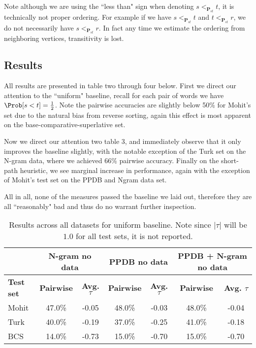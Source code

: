 \begin{remark}
	Note although we are using the ``less than" sign when denoting $s <_{\pmb{P}_{st}} t$, it is technically not proper ordering. For example if we have $s <_{\pmb{P}_{st}} t$ and $t <_{\pmb{P}_{st}} r$, we do not necessarily have $s <_{\pmb{P}_{st}} r$. In fact any time we estimate the ordering from neighboring vertices, transitivity is lost.
\end{remark}



\subsection{Results}

All results are presented in table two through four below. First we direct our attention to the ``uniform" baseline, recall for each pair of words we have $\Prob[s < t] = \frac{1}{2}$. Note the pairwise accuracies are slightly below 50\% for Mohit's set due to the natural bias from reverse sorting, again this effect is most apparent on the base-comparative-superlative set.

Now we direct our attention two table 3, and immediately observe that it only improves the baseline slightly, with the notable exception of the Turk set on the N-gram data, where we achieved $66\%$ pairwise accuracy. Finally on the short-path heuristic, we see marginal increase in performance, again with the exception of Mohit's test set on the PPDB and Ngram data set. 

All in all, none of the measures passed the baseline we laid out, therefore they are all ``reasonably" bad and thus do no warrant further inspection.


\begin{table}
\small
\centering
\begin{tabular}{|l|cc|cc|cc|}
	\hline 
	& \multicolumn{2}{c|}{N-gram no data} 
	& \multicolumn{2}{c|}{PPDB no data} 
	& \multicolumn{2}{c|}{PPDB + N-gram no data} \\
	\hline 
	\bf Test set
	& \bf Pairwise & \bf Avg. $\tau$  
	& \bf Pairwise & \bf Avg. $\tau$  
	& \bf Pairwise & \bf Avg. $\tau$  \\ 
	\hline
	Mohit & 47.0\% & -0.05  & 48.0\% & -0.03 & 48.0\% & -0.04 \\
	Turk  & 40.0\% & -0.19  & 37.0\% & -0.25 & 41.0\% & -0.18 \\
	BCS   & 14.0\% & -0.73  & 15.0\% & -0.70 & 15.0\% & -0.70 \\
	\hline
\end{tabular}
\caption{\label{font-table} Results across all datasets for uniform baseline. Note since $|\tau|$ will be $1.0$ for all test sets, it is not reported. }
\end{table}

